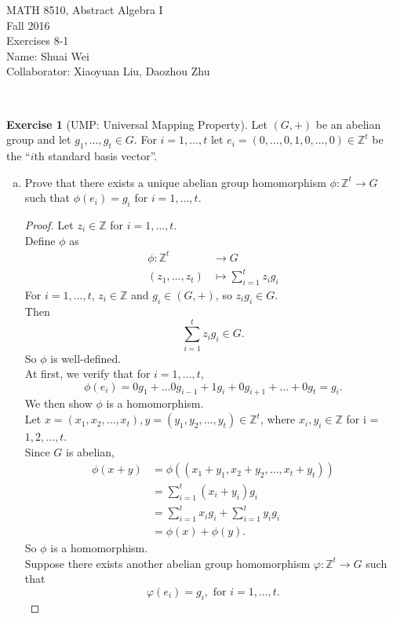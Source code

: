 \documentclass{amsart}
\newcommand{\bbz}{\mathbb{Z}}
\theoremstyle{plain}
\theoremstyle{definition}
\newtheorem{exer}[lem]{Exercise}
\begin{document}
\noindent MATH 8510, Abstract Algebra I \\
Fall 2016\\
Exercises 8-1\\
Name: Shuai Wei\\
Collaborator: Xiaoyuan Liu, Daozhou Zhu

\

%
%

\begin{exer}[UMP: Universal Mapping Property]
Let $(G,+)$ be an abelian group and let $g_1,\ldots,g_t\in G$. 
For $i=1,\ldots,t$ let $e_i=(0,\ldots,0,1,0,\ldots,0)\in\bbz^t$ be the ``$i$th standard basis vector''.
\begin{enumerate}[(a)]
\item 
Prove that there exists a unique abelian group homomorphism $\phi\colon\bbz^t\to G$ such that $\phi(e_i)=g_i$ for $i=1,\ldots,t$.
\begin{proof}
  Let $z_i \in \bbz$ for $i = 1,\ldots,t$.\\
  Define $\phi$ as
  \begin{align*}
  	\phi: \bbz^t &\to G \\
  			(z_1,\dots,z_t) & \mapsto \sum_{i=1}^tz_ig_i 
  \end{align*}
  For $i = 1,\ldots,t$, $z_i\in \bbz$ and $g_i \in (G,+)$, so $z_ig_i \in G$.\\
  Then 
  \[\sum_{i=1}^tz_ig_i \in G.\]
  So $\phi$ is well-defined.\\
  At first, we verify that for $i = 1,\ldots,t$,
  \[\phi(e_i) = 0g_1 + ...0g_{i-1} + 1g_i + 0g_{i+1} + \ldots + 0g_{t} = g_i.\]
  We then show $\phi$ is a homomorphism.\\
  Let $x=(x_1,x_2,\ldots,x_t), y=(y_1,y_2,\ldots,y_t) \in \bbz^t$, where $x_i,y_i \in \bbz$ for i = $1,2,\ldots,t$.\\
  Since $G$ is abelian,
  \begin{align*}
  	\phi(x+y) &= \phi((x_1+y_1,x_2+y_2,\ldots,x_t+y_t)) \\
  			 &= \sum_{i=1}^t(x_i+y_i)g_i \\
  			 &= \sum_{i=1}^tx_ig_i+\sum_{i=1}^ty_ig_i \\
  			 &= \phi(x)+\phi(y).
  \end{align*}
  So $\phi$ is a homomorphism.\\ 
  Suppose there exists another abelian group homomorphism $\varphi\colon\bbz^t\to G$ such that 
  \[\varphi(e_i)=g_i, \text{ for } {i=1,\ldots,t}.\]

\end{proof}
\end{enumerate}
\end{exer}
\end{document}
